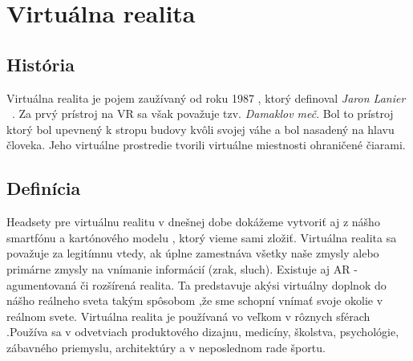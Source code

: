 \documentclass[10pt,twoside,slovak,a4paper]{article}										%
\begin{document}
\section{Virtuálna realita}	\label{VR}
\subsection{História} \label{VR:hist}		
Virtuálna realita je pojem zaužívaný od roku 1987 , ktorý definoval \emph{Jaron Lanier} ~\cite{Jaron:zdroj}. Za prvý prístroj na VR sa však považuje tzv. \emph{Damaklov meč}. Bol to prístroj ktorý bol upevnený k stropu budovy kvôli svojej váhe a bol nasadený na hlavu človeka. Jeho virtuálne prostredie tvorili virtuálne miestnosti ohraničené čiarami.

\subsection {Definícia} \label{VR:now}
 Headsety pre virtuálnu realitu v dnešnej dobe dokážeme vytvoriť aj z nášho smartfónu a kartónového modelu , ktorý vieme sami zložiť. Virtuálna realita sa považuje za legitímnu vtedy, ak úplne zamestnáva všetky naše zmysly alebo primárne zmysly na vnímanie informácií (zrak, sluch). Existuje aj AR - agumentovaná či rozšírená realita. Ta predstavuje akýsi virtuálny doplnok do nášho reálneho sveta takým spôsobom ,že sme schopní vnímať svoje okolie v reálnom svete. Virtuálna realita je používaná vo veľkom v rôznych sférach .Používa sa v odvetviach produktového dizajnu, medicíny, školstva, psychológie, zábavného priemyslu, architektúry a v neposlednom rade športu.
\end{document}
